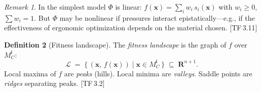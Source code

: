 \documentclass[10pt]{article}
\theoremstyle{definition}
\newtheorem{definition}{Definition}[section]
\theoremstyle{plain}
\theoremstyle{remark}
\newtheorem{remark}[definition]{Remark}
\newcommand{\MC}{M^{\mathsf{I}}_C}          %
\providecommand{\R}{}
\renewcommand{\R}{\mathbf{R}}               %
\newcommand{\FitLand}{\mathcal{L}}           %
\newcommand{\TF}[1]{\textnormal{[TF\,#1]}}  %
\begin{document}
\begin{remark}
In the simplest model $\Phi$ is linear:
$f(\bm{x}) = \sum_i w_i \, s_i(\bm{x})$ with $w_i \geq 0$,
$\sum w_i = 1$. But $\Phi$ may be nonlinear if pressures interact
epistatically---e.g., if the effectiveness of ergonomic optimization
depends on the material chosen. \TF{3.11}
\end{remark}

\begin{definition}[Fitness landscape]\label{def:3.2}
The \emph{fitness landscape} is the graph of $f$ over $\MC$:
\[
  \FitLand \;=\; \bigl\{\, (\bm{x},\, f(\bm{x}))
    \;\big|\; \bm{x} \in \MC \,\bigr\}
  \;\subseteq\; \R^{n+1}.
\]
Local maxima of $f$ are \emph{peaks} (hills). Local minima are
\emph{valleys}. Saddle points are \emph{ridges} separating peaks. \TF{3.2}
\end{definition}
\end{document}
